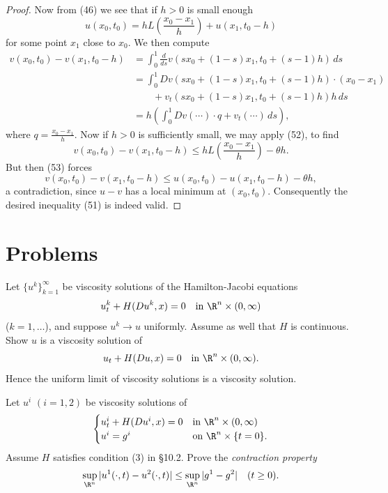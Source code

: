 \begin{proof}
Now from (46) we see that if $h > 0$ is small enough
\[
u(x_0, t_0) = hL\left(\frac{x_0 - x_1}{h}\right) + u(x_1, t_0 - h)
\tag{53}
\]
for some point $x_1$ close to $x_0$. We then compute
\[
\begin{aligned}
v(x_0, t_0) - v(x_1, t_0 - h) &= \int_0^1 \frac{d}{ds} v(sx_0 + (1-s)x_1, t_0 + (s-1)h) \, ds \\
&= \int_0^1 Dv(sx_0 + (1-s)x_1, t_0 + (s-1)h) \cdot (x_0 - x_1) \\
&\qquad + v_t(sx_0 + (1-s)x_1, t_0 + (s-1)h)h \, ds \\
&= h \left( \int_0^1 Dv(\cdots) \cdot q + v_t(\cdots) \, ds \right),
\end{aligned}
\]
where $q = \frac{x_0 - x_1}{h}$. Now if $h > 0$ is sufficiently small, we may apply (52), to find
\[
v(x_0, t_0) - v(x_1, t_0 - h) \le hL \left( \frac{x_0 - x_1}{h} \right) - \theta h.
\]
But then (53) forces
\[
v(x_0, t_0) - v(x_1, t_0 - h) \le u(x_0, t_0) - u(x_1, t_0 - h) - \theta h,
\]
a contradiction, since $u - v$ has a local minimum at $(x_0, t_0)$. Consequently the desired inequality (51) is indeed valid.
\end{proof}

\section{Problems}
\label{sec:hj-problems}

\begin{exercise}
Let $\{u^k\}_{k=1}^\infty$ be viscosity solutions of the Hamilton-Jacobi equations
\[
u_t^k + H(Du^k, x) = 0 \quad \text{in } \R^n \times (0, \infty)
\]
($k = 1, \ldots$), and suppose $u^k \to u$ uniformly. Assume as well that $H$ is continuous. Show $u$ is a viscosity solution of
\[
u_t + H(Du, x) = 0 \quad \text{in } \R^n \times (0, \infty).
\]
Hence the uniform limit of viscosity solutions is a viscosity solution.
\end{exercise}

\begin{exercise}
Let $u^i$ $(i = 1, 2)$ be viscosity solutions of
\[
\begin{cases}
u_t^i + H(Du^i, x) = 0 & \text{in } \R^n \times (0, \infty) \\
u^i = g^i & \text{on } \R^n \times \{t = 0\}.
\end{cases}
\]
Assume $H$ satisfies condition (3) in \S10.2. Prove the \textit{contraction property}
\[
\sup_{\R^n} |u^1(\cdot, t) - u^2(\cdot, t)| \le \sup_{\R^n} |g^1 - g^2| \quad (t \ge 0).
\]
\end{exercise}

